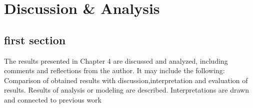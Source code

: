 \chapter{Discussion \& Analysis} \label{ch:discussion}


\section{first section}

The results presented in Chapter 4 are discussed and analyzed, including comments and reflections from the author. It may include the following: Comparison of obtained results with discussion,interpretation and evaluation of results. Results of analysis or modeling are described. Interpretations are drawn and connected to previous work